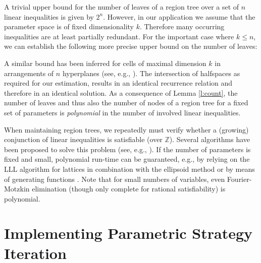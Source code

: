 \documentclass[a4paper]{easychair}
\renewcommand{\qed}{\hfill\mbox{\rule[0pt]{1.3ex}{1.3ex}}}
\newcommand{\ZZ}{\mathbb{Z}}
\begin{document}
\noindent
A trivial upper bound for the number of leaves of a region tree over a set of $n$ linear inequalities 
is given by $2^n$.
However, 
in our application we assume that the parameter space is of fixed dimensionality $k$.
Therefore many occurring inequalities are at least partially redundant.
For the important case where $k \leq n$, we can establish the following 
more precise upper bound on the number of leaves:



\noindent
A similar bound has been inferred for cells of maximal dimension $k$ in arrangements of $n$ hyperplanes
(see, e.g., \cite{HalperinCH24}). The intersection of halfspaces as required for our estimation,
results in an identical recurrence relation and therefore in an identical solution.
As a consequence of Lemma \ref{l:count}, the number of leaves and thus also the number of nodes of a region tree for 
a fixed set of parameters is \emph{polynomial} in the number of involved linear inequalities.


When maintaining region trees, we repeatedly must verify whether a (growing) conjunction
of linear inequalities is satisfiable (over $\ZZ$). Several algorithms have been proposed to solve this
problem (see, e.g., \cite{DBLP:conf/sc/Pught91,dillig09}). If the number of parameters is fixed and small,
polynomial run-time can be guaranteed, e.g., by relying on the LLL algorithm for 
lattices in combination with the ellipsoid method \cite{lll,khachiyan1980polynomial} or by means
of generating functions \cite{Loera_threeinteger}.
Note that for small numbers of variables, even Fourier-Motzkin elimination (though only complete for 
rational satisfiability) is polynomial. 


\section{Implementing Parametric Strategy Iteration}\label{s:implementation}
\end{document}
